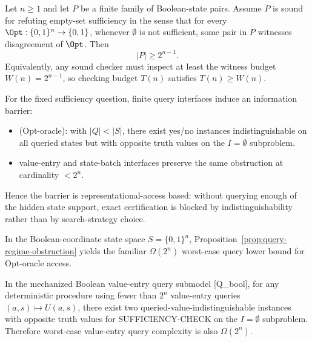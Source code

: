 \begin{proposition}\label{prop:checking-witnessing-duality}
Let $n\ge 1$ and let $P$ be a finite family of Boolean-state pairs.
Assume $P$ is sound for refuting empty-set sufficiency in the sense that for every
\(\Opt : \{0,1\}^n \to \{0,1\}\), whenever \(\emptyset\) is not sufficient, some pair in \(P\)
witnesses disagreement of \(\Opt\).
Then
\[
|P| \ge 2^{n-1}.
\]
Equivalently, any sound checker must inspect at least the witness budget
\(W(n)=2^{n-1}\), so checking budget \(T(n)\) satisfies \(T(n)\ge W(n)\).
\end{proposition}

\begin{corollary}\label{cor:information-barrier-query}
For the fixed sufficiency question, finite query interfaces induce an information barrier:
\begin{itemize}
\item [Q\_fin] (Opt-oracle): with $|Q|<|S|$, there exist yes/no instances indistinguishable on all queried states but with opposite truth values on the $I=\emptyset$ subproblem.
\item [Q\_bool] value-entry and state-batch interfaces preserve the same obstruction at cardinality $<2^n$.
\end{itemize}
Hence the barrier is representational-access based: without querying enough of the hidden state support, exact certification is blocked by indistinguishability rather than by search-strategy choice.
\end{corollary}

\begin{corollary}\label{cor:query-obstruction-bool}
In the Boolean-coordinate state space $S=\{0,1\}^n$, Proposition~\ref{prop:query-regime-obstruction} yields the familiar $\Omega(2^n)$ worst-case query lower bound for Opt-oracle access.
\end{corollary}

\begin{proposition}\label{prop:query-value-entry-lb}
In the mechanized Boolean value-entry query submodel [Q\_bool], for any deterministic procedure using fewer than $2^n$ value-entry queries $(a,s)\mapsto U(a,s)$, there exist two queried-value-indistinguishable instances with opposite truth values for SUFFICIENCY-CHECK on the $I=\emptyset$ subproblem. Therefore worst-case value-entry query complexity is also $\Omega(2^n)$.
\end{proposition}

